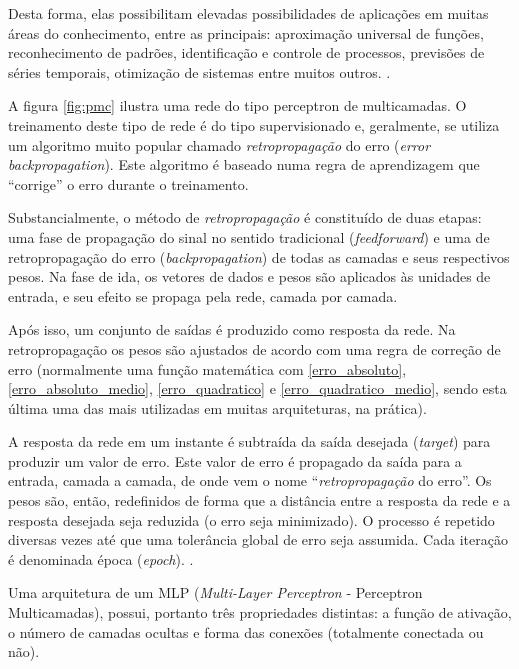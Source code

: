Desta forma, elas possibilitam elevadas possibilidades de aplicações em muitas áreas do conhecimento, entre as principais: aproximação universal de funções, reconhecimento de padrões, identificação e controle de processos, previsões de séries temporais, otimização de sistemas entre muitos outros. \cite{haykin_redes_2001}.

A figura \ref{fig:pmc} ilustra uma rede do tipo perceptron de multicamadas. O treinamento deste tipo de rede é do tipo supervisionado e, geralmente, se utiliza um algoritmo muito popular chamado \textit{retropropagação} do erro (\textit{error backpropagation}). Este algoritmo é baseado numa regra de aprendizagem que “corrige” o erro durante o treinamento. \cite{haykin_redes_2001}

Substancialmente, o método de \textit{retropropagação} é constituído de duas etapas: uma fase de propagação do sinal no sentido tradicional (\textit{feedforward}) e uma de retropropagação do erro (\textit{backpropagation}) de todas as camadas e seus respectivos pesos. Na fase de ida, os vetores de dados e pesos são aplicados às unidades de entrada, e seu efeito se propaga pela rede, camada por camada. \cite{hagan_neural_1996} \cite{haykin_redes_2001}

Após isso, um conjunto de saídas é produzido como resposta da rede. Na retropropagação os pesos são ajustados de acordo com uma regra de correção de erro (normalmente uma função matemática com \ref{erro_absoluto}, \ref{erro_absoluto_medio}, \ref{erro_quadratico} e \ref{erro_quadratico_medio}, sendo esta última uma das mais utilizadas em muitas arquiteturas, na prática). \cite{haykin_redes_2001} \cite{hagan_neural_1996} \cite{yeung_neural_2004}

A resposta da rede em um instante é subtraída da saída desejada (\textit{target}) para produzir um valor de erro. Este valor de erro é propagado da saída para a entrada, camada a camada, de onde vem o nome “\textit{retropropagação} do erro”. Os pesos são, então, redefinidos de forma que a distância entre a resposta da rede e a resposta desejada seja reduzida (o erro seja minimizado). O processo é repetido diversas vezes até que uma tolerância global de erro seja assumida. Cada iteração é denominada época (\textit{epoch}). \cite{haykin_redes_2001} \cite{hagan_neural_1996} \cite{minsky_perceptrons:_1969}.

Uma arquitetura de um MLP (\textit{Multi-Layer Perceptron} - Perceptron Multicamadas), possui, portanto três propriedades distintas: a função de ativação, o número de camadas ocultas e forma das conexões (totalmente conectada ou não).

